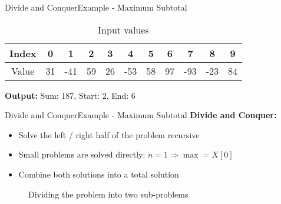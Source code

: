 
\begin{frame}{Divide and Conquer}{Example - Maximum Subtotal}
  \begin{example}
    \vspace{-1em}
    \begin{table}[!t]
      \caption{Input values}
      \begin{tabular}{c|c|c|c|c|c|c|c|c|c|c}
        Index & 0 & 1 & 2 & 3 & 4 & 5 & 6 & 7 & 8 & 9\\
        \midrule
        Value & 31 & -41 & 59 & 26 & -53 & 58 & 97 & -93 & -23 & 84
      \end{tabular}
      \label{tab:divide_and_conquer:max_subtotal_example_values}
    \end{table}
    \vspace{6em}
    \textbf{Output:} Sum: 187, Start: 2, End: 6
  \end{example}
\end{frame}


\begin{frame}{Divide and Conquer}{Example - Maximum Subtotal}
  \textbf{Divide and Conquer:}
  \begin{itemize}
    \item
      Solve the left / right half of the problem {\color{Mittel-Blau}recursive}
    \item
      Small problems are solved directly: $n = 1 \Rightarrow \max = X[0]$
    \item
      Combine both solutions into a total solution
  \end{itemize}
  \begin{figure}
    \begin{adjustbox}{width=\linewidth}
      
    \end{adjustbox}
    \caption{Dividing the problem into two sub-problems}
    \label{fig:divide_and_conquer:max_sub_total_divide}
  \end{figure}
\end{frame}


